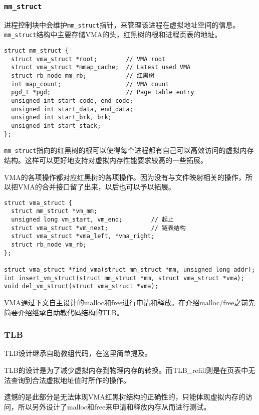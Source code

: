 \subsubsection{\texttt{mm\_struct}}

进程控制块中会维护\texttt{mm\_struct}指针，来管理该进程在虚拟地址空间的信息。\texttt{mm\_struct}结构中主要存储VMA的头，红黑树的根和进程页表的地址。

\begin{lstlisting}[caption=\texttt{mm\_struct}]
struct mm_struct {
  struct vma_struct *root;        // VMA root
  struct vma_struct *mmap_cache;  // Latest used VMA
  struct rb_node mm_rb;           // 红黑树
  int map_count;                  // VMA count
  pgd_t *pgd;                     // Page table entry
  unsigned int start_code, end_code;
  unsigned int start_data, end_data;
  unsigned int start_brk, brk;
  unsigned int start_stack;
};
\end{lstlisting}

\texttt{mm\_struct}指向的红黑树的根可以使得每个进程都有自己可以高效访问的虚拟内存结构。这样可以更好地支持对虚拟内存性能要求较高的一些拓展。

VMA的各项操作都对应红黑树的各项操作。因为没有与文件映射相关的操作，所以把VMA的合并接口留了出来，以后也可以予以拓展。

\begin{lstlisting}[caption=\texttt{vma\_struct}]
struct vma_struct {
  struct mm_struct *vm_mm;
  unsigned long vm_start, vm_end;        // 起止
  struct vma_struct *vm_next;            // 链表结构
  struct vma_struct *vma_left, *vma_right;
  struct rb_node vm_rb;
};

struct vma_struct *find_vma(struct mm_struct *mm, unsigned long addr);
int insert_vm_struct(struct mm_struct *mm, struct vma_struct *vma);
void del_vm_struct(struct vma_struct *vma);
\end{lstlisting}

VMA通过下文自主设计的malloc和free进行申请和释放。在介绍malloc/free之前先简要介绍继承自助教代码结构的TLB。

\subsubsection{TLB}

TLB设计继承自助教组代码，在这里简单提及。

TLB的设计是为了减少虚拟内存到物理内存的转换。而TLB\_refill则是在页表中无法查询到合法虚拟地址值时所作的操作。

遗憾的是此部分是无法体现VMA红黑树结构的正确性的，只能体现虚拟内存的访问，所以另外设计了malloc和free来申请和释放内存从而进行测试。

